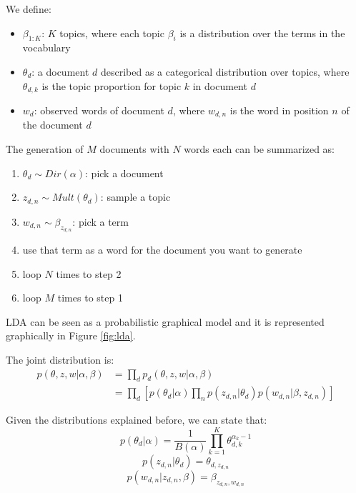 We define:
\begin{itemize}
    \item $\beta_{1:K}$: $K$ topics, where each topic $\beta_i$ is a distribution over the terms in the vocabulary
    \item $\theta_d$: a document $d$ described as a categorical distribution over topics, where $\theta_{d,k}$ is the topic proportion for topic $k$ in document $d$
    \item $w_{d}$: observed words of document $d$, where $w_{d,n}$ is the word in position $n$ of the document $d$
\end{itemize}

The generation of $M$ documents with $N$ words each can be summarized as:
\begin{enumerate}
    \item $\theta_d \sim Dir(\alpha)$: pick a document
    \item $z_{d,n} \sim Mult(\theta_d)$: sample a topic
    \item $w_{d,n} \sim \beta_{z_{d,n}}$: pick a term
    \item use that term as a word for the document you want to generate
    \item loop $N$ times to step 2
    \item loop $M$ times to step 1
\end{enumerate}

LDA can be seen as a probabilistic graphical model and it is represented graphically in Figure \ref{fig:lda}.

The joint distribution is:
\begin{equation*}
    \begin{split}
        p(\theta, z, w | \alpha, \beta) & = \prod_d p_d(\theta, z, w | \alpha, \beta) \\
        & = \prod_d [p(\theta_d | \alpha) \prod_n p(z_{d,n} | \theta_d) p(w_{d, n} | \beta, z_{d,n})]
    \end{split}
\end{equation*}

Given the distributions explained before, we can state that:
$$ p(\theta_d | \alpha) = \frac{1}{B(\alpha)} \prod_{k=1}^K \theta_{d,k}^{\alpha_k - 1}$$
$$ p(z_{d,n} | \theta_d) = \theta_{d, z_{d,n}} $$
$$ p(w_{d,n} | z_{d,n}, \beta) = \beta_{z_{d,n},w_{d,n}} $$

